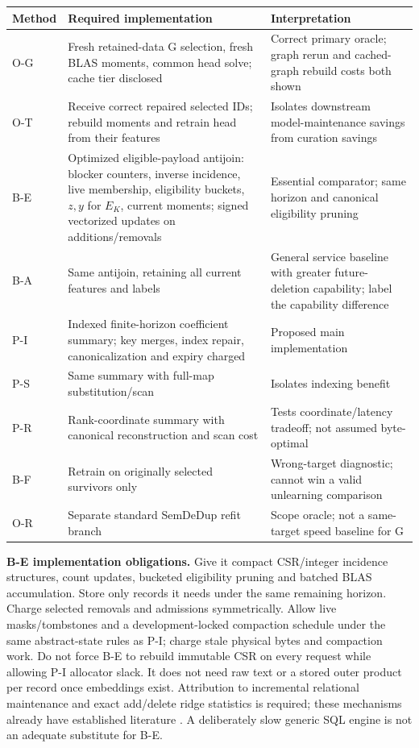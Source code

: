 \documentclass[11pt,a4paper]{article}
\newcommand{\smalltable}{\small\renewcommand{\arraystretch}{1.14}}
\begin{document}
{\smalltable
\begin{longtable}{p{.12\linewidth}p{.51\linewidth}p{.27\linewidth}}
\toprule Method & Required implementation & Interpretation\\\midrule\endhead
O-G & Fresh retained-data G selection, fresh BLAS moments, common head solve; cache tier disclosed & Correct primary oracle; graph rerun and cached-graph rebuild costs both shown\\
O-T & Receive correct repaired selected IDs; rebuild moments and retrain head from their features & Isolates downstream model-maintenance savings from curation savings\\
B-E & Optimized eligible-payload antijoin: blocker counters, inverse incidence, live membership, eligibility buckets, $z,y$ for $E_K$, current moments; signed vectorized updates on additions/removals & Essential comparator; same horizon and canonical eligibility pruning\\
B-A & Same antijoin, retaining all current features and labels & General service baseline with greater future-deletion capability; label the capability difference\\
P-I & Indexed finite-horizon coefficient summary; key merges, index repair, canonicalization and expiry charged & Proposed main implementation\\
P-S & Same summary with full-map substitution/scan & Isolates indexing benefit\\
P-R & Rank-coordinate summary with canonical reconstruction and scan cost & Tests coordinate/latency tradeoff; not assumed byte-optimal\\
B-F & Retrain on originally selected survivors only & Wrong-target diagnostic; cannot win a valid unlearning comparison\\
O-R & Separate standard SemDeDup refit branch & Scope oracle; not a same-target speed baseline for G\\
\bottomrule
\end{longtable}}

\textbf{B-E implementation obligations.} Give it compact CSR/integer incidence structures, count updates, bucketed eligibility pruning and batched BLAS accumulation. Store only records it needs under the same remaining horizon. Charge selected removals and admissions symmetrically. Allow live masks/tombstones and a development-locked compaction schedule under the same abstract-state rules as P-I; charge stale physical bytes and compaction work. Do not force B-E to rebuild immutable CSR on every request while allowing P-I allocator slack. It does not need raw text or a stored outer product per record once embeddings exist. Attribution to incremental relational maintenance and exact add/delete ridge statistics is required; these mechanisms already have established literature \cite{dbsp,quan}. A deliberately slow generic SQL engine is not an adequate substitute for B-E.
\end{document}
